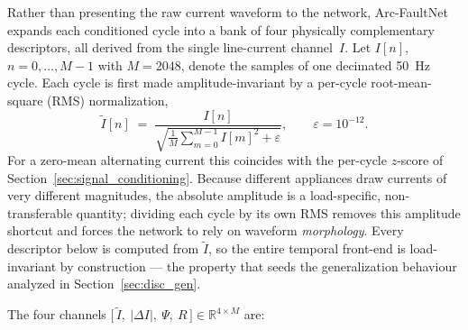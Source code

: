\documentclass[journal,article,submit,moreauthors]{Definitions/mdpi}
\begin{document}
Rather than presenting the raw current waveform to the network, Arc-FaultNet expands each conditioned cycle into a bank of four physically complementary descriptors, all derived from the single line-current channel~$I$. Let $I[n]$, $n = 0,\dots,M-1$ with $M = 2048$, denote the samples of one decimated 50~Hz cycle. Each cycle is first made amplitude-invariant by a per-cycle root-mean-square (RMS) normalization,
\begin{equation}
\tilde{I}[n] \;=\; \frac{I[n]}{\sqrt{\tfrac{1}{M}\sum_{m=0}^{M-1} I[m]^{2} + \varepsilon}},
\qquad \varepsilon = 10^{-12}.
\label{eq:rmsnorm}
\end{equation}
For a zero-mean alternating current this coincides with the per-cycle $z$-score of Section~\ref{sec:signal_conditioning}. Because different appliances draw currents of very different magnitudes, the absolute amplitude is a load-specific, non-transferable quantity; dividing each cycle by its own RMS removes this amplitude shortcut and forces the network to rely on waveform \emph{morphology}. Every descriptor below is computed from $\tilde{I}$, so the entire temporal front-end is load-invariant by construction --- the property that seeds the generalization behaviour analyzed in Section~\ref{sec:disc_gen}.

The four channels $\big[\,\tilde{I},\ |\Delta I|,\ \Psi,\ R\,\big] \in \mathbb{R}^{4\times M}$ are:
\end{document}
